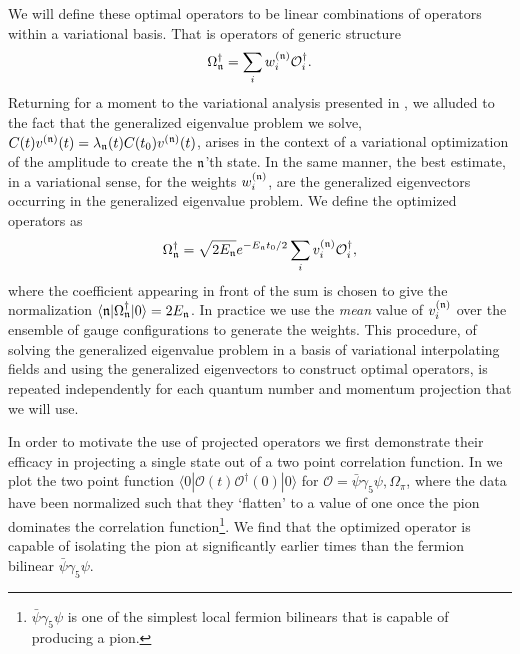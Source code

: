 We will define these optimal operators to be linear combinations of operators within a variational basis. That is operators of generic structure
\begin{equation*}
\Omega_{\mathfrak{n}}^\dagger = \sum_i w_i^{(\mathfrak{n})} \mathcal{O}_i^\dagger.
\end{equation*}
Returning for a moment to the variational analysis presented in , we alluded to the fact that the generalized eigenvalue problem we solve, $C(t)v^{(\mathfrak{n})}(t) = \lambda_{\mathfrak{n}}(t) C(t_0) v^{(\mathfrak{n})}(t)$, arises in the context of a variational optimization of the amplitude to create the $\mathfrak{n}$'th state. In the same manner, the best estimate, in a variational sense, for the weights $w_i^{(\mathfrak{n})}$, are the generalized eigenvectors occurring in the generalized eigenvalue problem. We define the optimized operators as 
\begin{equation*}
\Omega_{\mathfrak{n}}^\dagger = \sqrt{2E_{\mathfrak{n}}}e^{-E_{\mathfrak{n}}t_0/2} \sum_i v_i^{(\mathfrak{n})} \mathcal{O}_i^\dagger,
\end{equation*}
where the coefficient appearing in front of the sum is chosen to give the normalization $\langle \mathfrak{n}| \Omega_{\mathfrak{n}}^\dagger | 0 \rangle = 2E_{\mathfrak{n}}$. In practice we use the \emph{mean} value of $v_i^{(\mathfrak{n})}$ over the ensemble of gauge configurations to generate the weights. This procedure, of solving the generalized eigenvalue problem in a basis of variational interpolating fields and using the generalized eigenvectors to construct optimal operators, is repeated independently for each quantum number and momentum projection that we will use. 

In order to motivate the use of projected operators we first demonstrate their efficacy in projecting a single state out of a two point correlation function. In  we plot the two point function $\langle 0 | \mathcal{O}(t) \mathcal{O}^\dagger(0) | 0 \rangle$ for $\mathcal{O} = \bar{\psi}\gamma_5\psi, \Omega_\pi$, where the data have been normalized such that they `flatten' to a value of one once the pion dominates the correlation function\footnote{$\bar{\psi}\gamma_5\psi$ is one of the simplest local fermion bilinears that is capable of producing a pion.}. We find that the optimized operator is capable of isolating the pion at significantly earlier times than the fermion bilinear $\bar{\psi}\gamma_5\psi$. 

